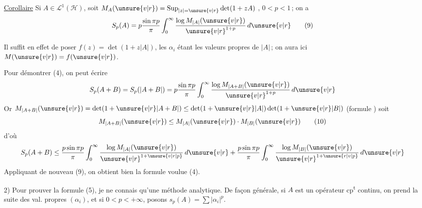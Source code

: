 \uline{Corollaire}\quad\margin{\rule[-3.8cm]{0.4pt}{3.8cm}} Si $A\in\mathcal L^1(\mathcal H)$, soit
$M_A(\unsure{v|r})=\operatorname*{Sup}_{|z|=\unsure{v|r}}\det(1+zA)$
, 
  $0<p<1$\,; on a
\[
S_p(A)=p\frac{\sin\pi p}{\pi}\int_0^\infty\frac{\log M_{|A|}(\unsure{v|r})}{{\unsure{v|r}}^{1+p}}\,d\unsure{v|r}\tag*{(9)}
\]

Il suffit en effet de poser $f(z)=\det(1+z|A|)$,
les $\alpha_i$ étant les valeurs propres de $|A|$\,; on aura
ici $M(\unsure{v|r})=f(\unsure{v|r})$.

Pour démontrer (4), on  peut écrire
\[
S_p(A+B)=S_p(|A+B|)=p\frac{\sin\pi p}{\pi}\int_0^\infty
\frac{\log M_{|A+B|}(\unsure{v|r})}{{\unsure{v|r}}^{1+p}}\,d\unsure{v|r}
\]
Or $M_{|A+B|}(\unsure{v|r})=\det(1+\unsure{v|r}|A+B|)\leq\det(1+\unsure{v|r}|A|)\det(1+\unsure{v|r}|B|)$
(formule \unsure{\ldots})  soit
\[
M_{|A+B|}(\unsure{v|r})\leq M_{|A|}(\unsure{v|r})\cdot M_{|B|}(\unsure{v|r})\tag*{(10)}
\]
d'où
\[
S_p(A+B)\leq\frac{p\sin\pi p}{\pi}\int_0^\infty\frac{\log M_{|A|}(\unsure{v|r})}{{\unsure{v|r}}^{1+\unsure{v|r|p}}}\,d\unsure{v|r}
+\frac{p\sin\pi p}{\pi}\int_0^\infty\frac{\log M_{|B|}(\unsure{v|r})}{{\unsure{v|r}}^{1+\unsure{r|v|p}}}\,d\unsure{v|r}
\]
Appliquant de nouveau (9), on obtient bien la
formule voulue (4).


2) Pour prouver la formule (5), je ne connais
qu'une méthode analytique. De façon générale,
 si $A$ est un opérateur cp\textsuperscript{t} continu, on prend la
suite des val. propres $(\alpha_i)$,  et si
$0<p<+\infty$, posons $s_p(A)=\sum|\alpha_i|^p$.
